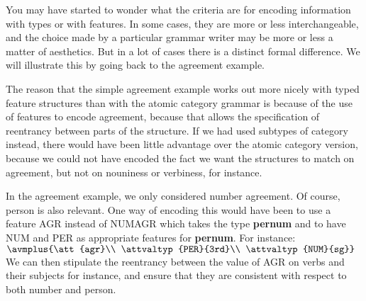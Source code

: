 \documentclass[12pt]{report}
\begin{document}
You may have started to wonder what the criteria are for encoding information
with types or with features.  
In some cases, they are more or less interchangeable,
and the choice made by a particular grammar writer may be
more or less a matter of aesthetics.  But in a lot of cases
there is a distinct formal difference.  
We will illustrate this by going back to
the agreement example.

The reason that the simple agreement 
example works out more nicely with typed feature structures than with the
atomic category grammar is because of the use of features to encode
agreement, because that allows the specification of reentrancy between
parts of the structure.  If we had used subtypes of category 
instead, there would have been 
little advantage over
the atomic category version, because we could not have encoded the fact we
want the structures to match on agreement, but not on nouniness or verbiness,
for instance.  

In the agreement example, we only considered number agreement.  Of course,
person is also relevant.  
One way of encoding this would have been to use a feature AGR instead of NUMAGR
which takes the type {\bf pernum}
and to have NUM and PER as appropriate features for {\bf pernum}.
For instance:\\
{\tiny $\avmplus{\att{agr}\\ \attvaltyp{PER}{3rd}\\  \attvaltyp{NUM}{sg}}$}\\
We can then stipulate the reentrancy between the value of AGR on verbs and their
subjects for instance, and ensure that they are consistent with respect to both
number and person.
\end{document}
